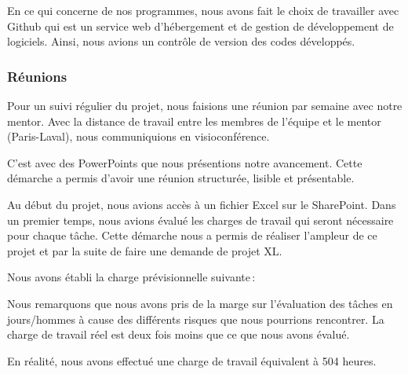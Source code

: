 En ce qui concerne de nos programmes, nous avons fait le choix de travailler avec Github qui est un service web d'hébergement et de gestion de développement de logiciels.
Ainsi, nous avions un contrôle de version des codes développés.

\subsubsection{Réunions}
Pour un suivi régulier du projet, nous faisions une réunion par semaine avec notre mentor.
Avec la distance de travail entre les membres de l'équipe et le mentor (Paris-Laval), nous communiquions en visioconférence.

C'est avec des PowerPoints que nous présentions notre avancement.
Cette démarche a permis d’avoir une réunion structurée, lisible et présentable. 




Au début du projet, nous avions accès à un fichier Excel sur le SharePoint.
Dans un premier temps, nous avions évalué les charges de travail qui seront nécessaire pour chaque tâche.
Cette démarche nous a permis de réaliser l'ampleur de ce projet et par la suite de faire une demande de projet XL\@.  

Nous avons établi la charge prévisionnelle suivante :  



Nous remarquons que nous avons pris de la marge sur l'évaluation des tâches en jours/hommes à cause des différents risques que nous pourrions rencontrer.
La charge de travail réel est deux fois moins que ce que nous avons évalué.  

En réalité, nous avons effectué une charge de travail équivalent à 504 heures.








